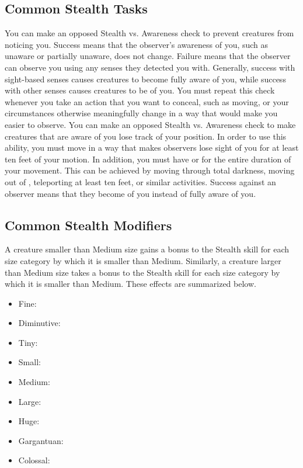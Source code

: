   \subsection{Common Stealth Tasks}
     You can make an opposed Stealth vs. Awareness check to prevent creatures from noticing you.
    Success means that the observer's awareness of you, such as unaware or partially unaware, does not change.
    Failure means that the observer can observe you using any senses they detected you with.
    Generally, success with sight-based senses causes creatures to become fully aware of you, while success with other senses causes creatures to be \partiallyunaware of you.
    You must repeat this check whenever you take an action that you want to conceal, such as moving, or your circumstances otherwise meaningfully change in a way that would make you easier to observe.
     You can make an opposed Stealth vs. Awareness check to make creatures that are aware of you lose track of your position.
    In order to use this ability, you must move in a way that makes observers lose sight of you for at least ten feet of your motion.
    In addition, you must have  or  for the entire duration of your movement.
    This can be achieved by moving through total darkness, moving out of , teleporting at least ten feet, or similar activities.
    Success against an observer means that they become \partiallyunaware of you instead of fully aware of you.

  \subsection{Common Stealth Modifiers}\label{Common Stealth Modifiers}

    A creature smaller than Medium size gains a  bonus to the Stealth skill for each size category by which it is smaller than Medium.
    Similarly, a creature larger than Medium size takes a  bonus to the Stealth skill for each size category by which it is smaller than Medium.
    These effects are summarized below.
    \begin{itemize}
      \item Fine: 
      \item Diminutive: 
      \item Tiny: 
      \item Small: 
      \item Medium: 
      \item Large: 
      \item Huge: 
      \item Gargantuan: 
      \item Colossal: 
    \end{itemize}

